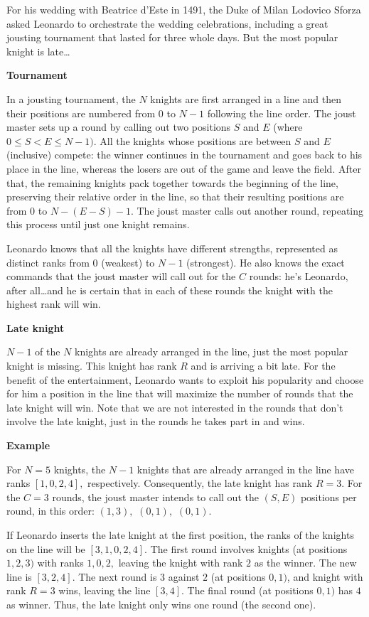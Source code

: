 For his wedding with Beatrice d'Este in 1491, the Duke of Milan Lodovico Sforza asked Leonardo to orchestrate the wedding celebrations, including a great jousting tournament that lasted for three whole days. But the most popular knight is late\dots 

\bf{Tournament}

In a jousting tournament, the $N$ knights are first arranged in a line and then their positions are numbered from 0 to $N - 1$ following the line order. The joust master sets up a round by calling out two positions $S$ and $E$ (where $0 \le S < E \le N - 1).$ All the knights whose positions are between $S$ and $E$ (inclusive) compete: the winner continues in the tournament and goes back to his place in the line, whereas the losers are out of the game and leave the field. After that, the remaining knights pack together towards the beginning of the line, preserving their relative order in the line, so that their resulting positions are from $0$ to $N - (E - S) - 1.$ The joust master calls out another round, repeating this process until just one knight remains.

Leonardo knows that all the knights have different strengths, represented as distinct ranks from $0$ (weakest) to $N - 1$ (strongest). He also knows the exact commands that the joust master will call out for the $C$ rounds: he's Leonardo, after all\dots and he is certain that in each of these rounds the knight with the highest rank will win.

\bf{Late knight}

$N - 1$ of the $N$ knights are already arranged in the line, just the most popular knight is missing. This knight has rank $R$ and is arriving a bit late. For the benefit of the entertainment, Leonardo wants to exploit his popularity and choose for him a position in the line that will maximize the number of rounds that the late knight will win. Note that we are not interested in the rounds that don't involve the late knight, just in the rounds he takes part in and wins.

\bf{Example}

For $N = 5$ knights, the $N - 1$ knights that are already arranged in the line have ranks $[1, 0, 2, 4],$ respectively. Consequently, the late knight has rank $R = 3.$ For the $C = 3$ rounds, the joust master intends to call out the $(S, E)$ positions per round, in this order: $(1, 3),$ $(0, 1),$ $(0, 1).$

If Leonardo inserts the late knight at the first position, the ranks of the knights on the line will be $[3, 1, 0, 2, 4].$ The first round involves knights (at positions $1, 2, 3)$ with ranks $1, 0, 2,$ leaving the knight with rank $2$ as the winner. The new line is $[3, 2, 4].$ The next round is $3$ against $2$ (at positions $0, 1)$, and knight with rank $R = 3$ wins, leaving the line $[3, 4].$ The final round (at positions $0, 1)$ has $4$ as winner. Thus, the late knight only wins one round (the second one).

